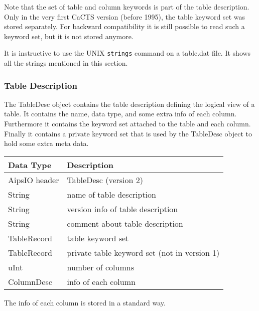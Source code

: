 Note that the set of table and column keywords is part of the table
description.
Only in the very first CaCTS version (before 1995), the table
keyword set was stored separately. For backward compatibility it is
still possible to read such a keyword set, but it is not stored
anymore.

It is instructive to use the UNIX \texttt{strings} command on a
table.dat file. It shows all the strings mentioned in this section.


\subsubsection{Table Description}
The TableDesc object contains the table description defining 
the logical view of a table. It contains
the name, data type, and some extra info of each column. Furthermore
it contains the keyword set attached to the table and each column.
Finally it contains a private keyword set that is used by the
TableDesc object to hold some extra meta data.

\vspace{0.15in}
\begin{tabular}{|l|p{13cm}|} \hline
  Data Type & Description \\ \hline\hline
  AipsIO header & TableDesc (version 2) \\
  String & name of table description \\
  String & version info of table description \\
  String & comment about table description\\
  TableRecord & table keyword set \\
  TableRecord & private table keyword set (not in version 1) \\
  uInt & number of columns \\
  ColumnDesc & info of each column \\
  \hline
\end{tabular}
\vspace{0.15in}

The info of each column is stored in a standard way.

